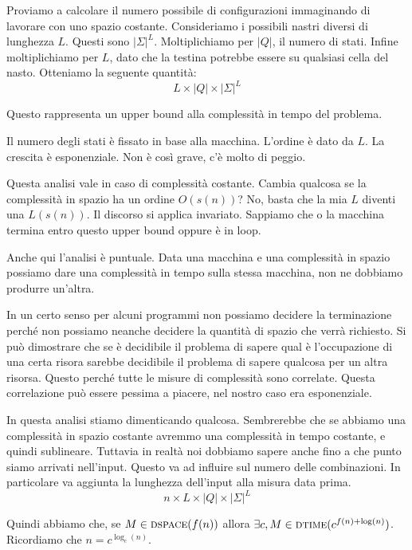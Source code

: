 Proviamo a calcolare il numero possibile di configurazioni immaginando di lavorare con uno spazio
costante. Consideriamo i possibili nastri diversi di lunghezza $L$. Questi sono $|\Sigma|^{L}$.
Moltiplichiamo per $|Q|$, il numero di stati. Infine moltiplichiamo per $L$, dato che la testina
potrebbe essere su qualsiasi cella del nasto. Otteniamo la seguente quantità:
\begin{equation*}
    L \times |Q| \times |\Sigma|^{L}
\end{equation*}

Questo rappresenta un upper bound alla complessità in tempo del problema.

Il numero degli stati è fissato in base alla macchina. L'ordine è dato da $L$. La crescita è
esponenziale. Non è così grave, c'è molto di peggio.

Questa analisi vale in caso di complessità costante. Cambia qualcosa se la complessità in spazio
ha un ordine $O(s(n))$? No, basta che la mia $L$ diventi una $L(s(n))$. Il discorso si applica
invariato. Sappiamo che o la macchina termina entro questo upper bound oppure è in loop.

Anche qui l'analisi è puntuale. Data una macchina e una complessità in spazio possiamo dare una
complessità in tempo sulla stessa macchina, non ne dobbiamo produrre un'altra.

In un certo senso per alcuni programmi non possiamo decidere la terminazione perché non possiamo
neanche decidere la quantità di spazio che verrà richiesto. Si può dimostrare che se è decidibile il
problema di sapere qual è l'occupazione di una certa risora sarebbe decidibile il problema di sapere
qualcosa per un altra risorsa. Questo perché tutte le misure di complessità sono correlate. Questa
correlazione può essere pessima a piacere, nel nostro caso era esponenziale.

In questa analisi stiamo dimenticando qualcosa. Sembrerebbe che se abbiamo una complessità in
spazio costante avremmo una complessità in tempo costante, e quindi sublineare. Tuttavia in realtà
noi dobbiamo sapere anche fino a che punto siamo arrivati nell'input. Questo va ad influire sul
numero delle combinazioni. In particolare va aggiunta la lunghezza dell'input alla misura data
prima.
\begin{equation*}
    n\times L \times |Q| \times |\Sigma|^{L}
\end{equation*}

Quindi abbiamo che, se $M \in \textsc{dspace}(f(n))$ allora $\exists c, M \in \textsc{dtime}(c^{f(n) + \log(n)})$.
Ricordiamo che $n = c^{\log_{c}(n)}$.

